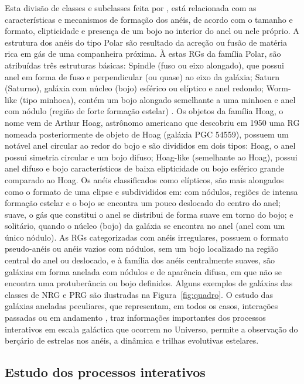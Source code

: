 Esta divisão de classes e subclasses feita por , está relacionada com as características e mecanismos de formação dos anéis, de acordo com o tamanho e formato, elipticidade e presença de um bojo no interior do anel ou nele próprio. A estrutura dos anéis do tipo Polar são resultado da acreção ou fusão de matéria rica em gás de uma companheira próxima. À estas RGs da família Polar, são atribuídas três estruturas básicas: Spindle (fuso ou eixo alongado), que possui anel em forma de fuso e perpendicular (ou quase) ao eixo da galáxia; Saturn (Saturno), galáxia com núcleo (bojo) esférico ou elíptico e anel redondo; Worm-like (tipo minhoca), contém um bojo alongado semelhante a uma minhoca e anel com nódulo (região de forte formação estelar) \cite{1998abans}. Os objetos da família Hoag, o nome vem de Arthur Hoag, astrônomo americano que descobriu em 1950 uma RG nomeada posteriormente de objeto de Hoag (galáxia PGC 54559), possuem um notável anel circular ao redor do bojo e são divididos em dois tipos: Hoag, o anel possui simetria circular e um bojo difuso; Hoag-like (semelhante ao Hoag), possui anel difuso e bojo característicos de baixa elipticidade ou bojo esférico grande comparado ao Hoag. Os anéis classificados como elípticos, são mais alongados como o formato de uma elipse e subdivididos em: com nódulos, regiões de intensa formação estelar e o bojo se encontra um pouco deslocado do centro do anel; suave, o gás que constitui o anel se distribui de forma suave em torno do bojo; e solitário, quando o núcleo (bojo) da galáxia se encontra no anel (anel com um único nódulo). As RGs categorizadas com anéis irregulares, possuem o formato pseudo-anéis ou anéis vazios com nódulos, sem um bojo localizado na região central do anel ou deslocado, e à família dos anéis centralmente suaves, são galáxias em forma anelada com nódulos e de aparência difusa, em que não se encontra uma protuberância ou bojo definidos. Alguns exemplos de galáxias das classes de NRG e PRG são ilustradas na Figura~\ref{fig:quadro}. O estudo das galáxias aneladas peculiares, que representam, em todos os casos, interações passadas ou em andamento \cite{1983AJ}, traz informações importantes dos processos interativos em escala galáctica que ocorrem no Universo, permite a observação do berçário de estrelas nos anéis, a dinâmica e trilhas evolutivas estelares.

\subsection{Estudo dos processos interativos}

